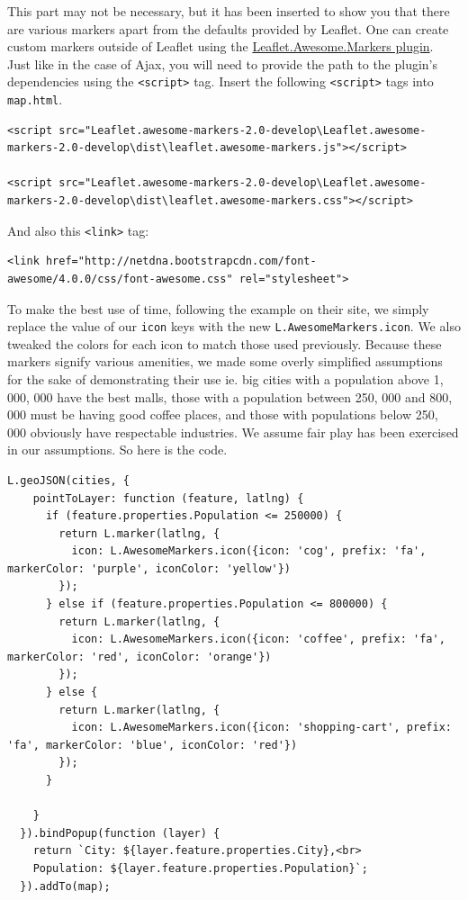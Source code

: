 \documentclass[
]{book}
\begin{document}
This part may not be necessary, but it has been inserted to show you that there are various markers apart from the defaults provided by Leaflet. One can create custom markers outside of Leaflet using the \href{https://github.com/lennardv2/Leaflet.awesome-markers}{Leaflet.Awesome.Markers plugin}. Just like in the case of Ajax, you will need to provide the path to the plugin's dependencies using the \texttt{\textless{}script\textgreater{}} tag. Insert the following \texttt{\textless{}script\textgreater{}} tags into \texttt{map.html}.

\begin{verbatim}
<script src="Leaflet.awesome-markers-2.0-develop\Leaflet.awesome-markers-2.0-develop\dist\leaflet.awesome-markers.js"></script>

<script src="Leaflet.awesome-markers-2.0-develop\Leaflet.awesome-markers-2.0-develop\dist\leaflet.awesome-markers.css"></script>
\end{verbatim}

And also this \texttt{\textless{}link\textgreater{}} tag:

\begin{verbatim}
<link href="http://netdna.bootstrapcdn.com/font-awesome/4.0.0/css/font-awesome.css" rel="stylesheet"> 
\end{verbatim}

To make the best use of time, following the example on their site, we simply replace the value of our \texttt{icon} keys with the new \texttt{L.AwesomeMarkers.icon}. We also tweaked the colors for each icon to match those used previously. Because these markers signify various amenities, we made some overly simplified assumptions for the sake of demonstrating their use ie. big cities with a population above 1, 000, 000 have the best malls, those with a population between 250, 000 and 800, 000 must be having good coffee places, and those with populations below 250, 000 obviously have respectable industries. We assume fair play has been exercised in our assumptions. So here is the code.

\begin{verbatim}
L.geoJSON(cities, {
    pointToLayer: function (feature, latlng) {
      if (feature.properties.Population <= 250000) {
        return L.marker(latlng, {
          icon: L.AwesomeMarkers.icon({icon: 'cog', prefix: 'fa', markerColor: 'purple', iconColor: 'yellow'}) 
        });
      } else if (feature.properties.Population <= 800000) {
        return L.marker(latlng, {
          icon: L.AwesomeMarkers.icon({icon: 'coffee', prefix: 'fa', markerColor: 'red', iconColor: 'orange'}) 
        });
      } else {
        return L.marker(latlng, {
          icon: L.AwesomeMarkers.icon({icon: 'shopping-cart', prefix: 'fa', markerColor: 'blue', iconColor: 'red'})
        });
      }
      
    }
  }).bindPopup(function (layer) {
    return `City: ${layer.feature.properties.City},<br>
    Population: ${layer.feature.properties.Population}`;
  }).addTo(map);
\end{verbatim}
\end{document}
